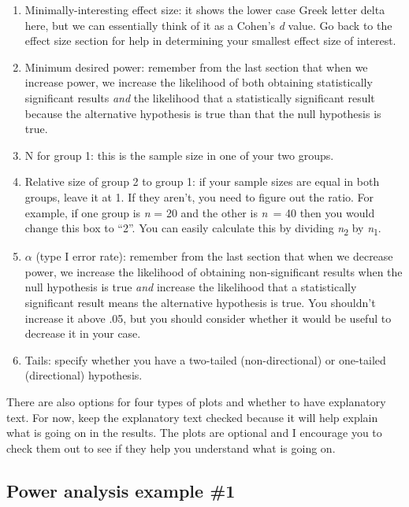 \documentclass[
]{book}
\providecommand{\tightlist}{%
  \setlength{\itemsep}{0pt}\setlength{\parskip}{0pt}}
\begin{document}
\begin{enumerate}
\def\labelenumi{\arabic{enumi}.}
\tightlist
\item
  Minimally-interesting effect size: it shows the lower case Greek letter delta here, but we can essentially think of it as a Cohen's \emph{d} value. Go back to the effect size section for help in determining your smallest effect size of interest.
\item
  Minimum desired power: remember from the last section that when we increase power, we increase the likelihood of both obtaining statistically significant results \emph{and} the likelihood that a statistically significant result because the alternative hypothesis is true than that the null hypothesis is true.
\item
  N for group 1: this is the sample size in one of your two groups.
\item
  Relative size of group 2 to group 1: if your sample sizes are equal in both groups, leave it at 1. If they aren't, you need to figure out the ratio. For example, if one group is \emph{n} = 20 and the other is \emph{n}~= 40 then you would change this box to ``2''. You can easily calculate this by dividing \emph{n}\textsubscript{2} by \emph{n}\textsubscript{1}.
\item
  \(\alpha\) (type I error rate): remember from the last section that when we decrease power, we increase the likelihood of obtaining non-significant results when the null hypothesis is true \emph{and} increase the likelihood that a statistically significant result means the alternative hypothesis is true. You shouldn't increase it above .05, but you should consider whether it would be useful to decrease it in your case.
\item
  Tails: specify whether you have a two-tailed (non-directional) or one-tailed (directional) hypothesis.
\end{enumerate}

There are also options for four types of plots and whether to have explanatory text. For now, keep the explanatory text checked because it will help explain what is going on in the results. The plots are optional and I encourage you to check them out to see if they help you understand what is going on.

\hypertarget{power-analysis-example-1}{%
\subsection{Power analysis example \#1}\label{power-analysis-example-1}}
\end{document}
